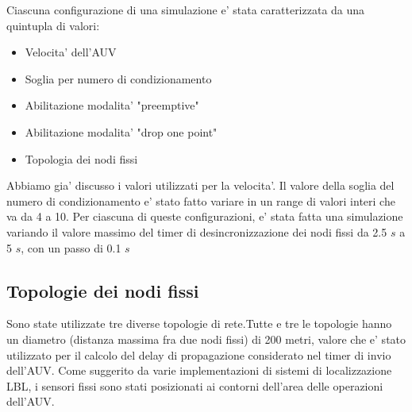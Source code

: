 \par
Ciascuna configurazione di una simulazione e' stata caratterizzata da una quintupla di valori:
\begin{itemize}
    \item Velocita' dell'AUV
    \item Soglia per numero di condizionamento
    \item Abilitazione modalita' "preemptive"
    \item Abilitazione modalita' "drop one point"
    \item Topologia dei nodi fissi
\end{itemize}
Abbiamo gia' discusso i valori utilizzati per la velocita'. Il valore della soglia del numero di condizionamento e' stato fatto variare in un range di valori interi che va da 4 a 10. Per ciascuna di queste configurazioni, e' stata fatta una simulazione variando il valore massimo del timer di desincronizzazione dei nodi fissi da 2.5 $s$ a 5 $s$, con un passo di 0.1 $s$

\subsection{Topologie dei nodi fissi}
Sono state utilizzate tre diverse topologie di rete.\newline Tutte e tre le topologie hanno un diametro (distanza massima fra due nodi fissi) di 200 metri, valore che e' stato utilizzato per il calcolo del delay di propagazione considerato nel timer di invio dell'AUV. \newline Come suggerito da varie implementazioni di sistemi di localizzazione LBL, i sensori fissi sono stati posizionati ai contorni dell'area delle operazioni dell'AUV. \newline
